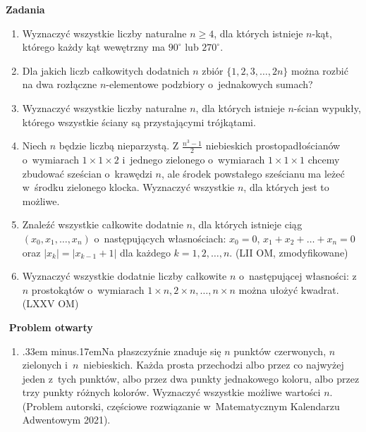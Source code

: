 \textbf{Zadania}
\begin{enumerate}[widest=1,itemsep=0pt]
\item Wyznaczyć wszystkie liczby naturalne $n\ge4$, dla których istnieje $n$-kąt, którego każdy kąt wewętrzny ma $90^\circ$ lub $270^\circ$.
\item Dla jakich liczb całkowitych dodatnich $n$ zbiór $\{1,2,3,\ldots,2n\}$ można rozbić na dwa rozłączne $n$-elementowe podzbiory o~jednakowych sumach?
\item Wyznaczyć wszystkie liczby naturalne $n$, dla których istnieje $n$-ścian wypukły, którego wszystkie ściany są przystającymi trójkątami.
\item Niech $n$ będzie liczbą nieparzystą. Z $\frac{n^3-1}2$ niebieskich
prostopadłościanów o~wymiarach $1\times1\times2$ i~jednego zielonego o~wymiarach
$1\times1\times1$ chcemy zbudować sześcian o~krawędzi $n$, ale środek powstałego
sześcianu ma leżeć w~środku zielonego klocka. Wyznaczyć wszystkie $n$, dla
których jest to możliwe.  \item Znaleźć wszystkie całkowite dodatnie $n$, dla
których istnieje ciąg $(x_0,x_1,\ldots,x_n)$ o~następujących własnościach:
$x_0=0$, $x_1+x_2+\ldots+x_n=0$ oraz $|x_k|=|x_{k-1}+1|$ dla każdego
$k=1,2,\ldots,n$. (LII OM, zmodyfikowane)
\item Wyznaczyć wszystkie dodatnie liczby całkowite $n$ o~następującej własności: z $n$ prostokątów o~wymiarach $1\times n, 2\times n, \ldots, n\times n$ można ułożyć kwadrat. (LXXV OM)
﻿\end{enumerate}
﻿
\textbf{Problem otwarty}
\begin{enumerate} \setcounter{enumi}6
\item {\spaceskip.33em minus.17emNa płaszczyźnie znaduje się $n$ punktów czerwonych, $n$ zielonych i~$n$~niebieskich.} Każda prosta przechodzi albo przez co najwyżej jeden z~tych punktów, albo przez dwa punkty jednakowego koloru, albo przez trzy punkty różnych kolorów. Wyznaczyć wszystkie możliwe wartości $n$. (Problem autorski, częściowe rozwiązanie w~Matematycznym Kalendarzu Adwentowym 2021).
\end{enumerate}



\eject